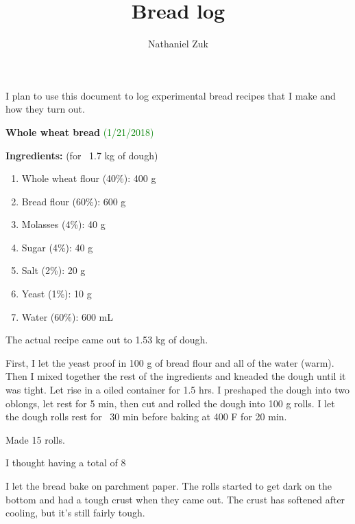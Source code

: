 \documentclass[11pt]{article}
\title{Bread log}
\author{Nathaniel Zuk}
\begin{document}
I plan to use this document to log experimental bread recipes that I make and how they turn out.

\textbf{Whole wheat bread} \textcolor{green}{(1/21/2018)}

\textbf{Ingredients:} (for ~1.7 kg of dough)

\begin{enumerate}
\item Whole wheat flour (40\%): 400 g
\item Bread flour (60\%): 600 g
\item Molasses (4\%): 40 g
\item Sugar (4\%): 40 g
\item Salt (2\%): 20 g
\item Yeast (1\%): 10 g
\item Water (60\%): 600 mL
\end{enumerate}

The actual recipe came out to 1.53 kg of dough.

First, I let the yeast proof in 100 g of bread flour and all of the water (warm).  Then I mixed together the rest of the ingredients and kneaded the dough until it was tight.  Let rise in a oiled container for 1.5 hrs.  I preshaped the dough into two oblongs, let rest for 5 min, then cut and rolled the dough into 100 g rolls.  I let the dough rolls rest for ~30 min before baking at 400 F for 20 min.

Made 15 rolls.

I thought having a total of 8%

I let the bread bake on parchment paper.  The rolls started to get dark on the bottom and had a tough crust when they came out.  The crust has softened after cooling, but it's still fairly tough.  
\end{document}
